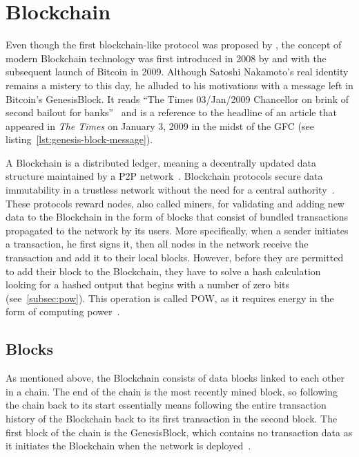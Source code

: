 \section{Blockchain}\label{sec:blockchain}

Even though the first blockchain-like protocol was proposed by \textcite{chaum_computer_1982}, the concept of modern \gls{Blockchain} technology was first introduced in 2008 by \textcite{nakamoto_bitcoin_2008} and with the subsequent launch of Bitcoin in 2009.
Although Satoshi Nakamoto's real identity remains a mistery to this day, he alluded to his motivations with a message left in Bitcoin's \gls{GenesisBlock}.
It reads \enquote{The Times 03/Jan/2009 Chancellor on brink of second bailout for banks}~\autocite{nakamoto_bitcoin_2009} and is a reference to the headline of an article that appeared in \emph{The Times} on January 3, 2009 in the midst of the \gls{GFC} (see listing~\ref{lst:genesis-block-message}).


A \gls{Blockchain} is a distributed ledger, meaning a decentrally updated data structure maintained by a \gls{P2P} network~\autocites[3]{crosby_blockchain_2015}[1]{nakamoto_bitcoin_2008}.
\Gls{Blockchain} protocols secure data immutability in a trustless network without the need for a central authority~\autocites[3]{crosby_blockchain_2015}[4]{jafar_blockchain_2021}.
These protocols reward nodes, also called miners, for validating and adding new data to the \gls{Blockchain} in the form of blocks that consist of bundled transactions propagated to the network by its users.
More specifically, when a sender initiates a transaction, he first signs it, then all nodes in the network receive the transaction and add it to their local blocks.
However, before they are permitted to add their block to the \gls{Blockchain}, they have to solve a hash calculation looking for a hashed output that begins with a number of zero bits (see~\cref{subsec:pow}).
This operation is called \gls{POW}, as it requires energy in the form of computing power~\autocite[3]{nakamoto_bitcoin_2008}.

\subsection{Blocks}\label{subsec:blocks}

As mentioned above, the \gls{Blockchain} consists of data blocks linked to each other in a chain.
The end of the chain is the most recently mined block, so following the chain back to its start essentially means following the entire transaction history of the \gls{Blockchain} back to its first transaction in the second block.
The first block of the chain is the \gls{GenesisBlock}, which contains no transaction data as it initiates the \gls{Blockchain} when the network is deployed~\autocites[162]{antonopoulos_mastering_2017}[31]{antonopoulos_mastering_2019}.

